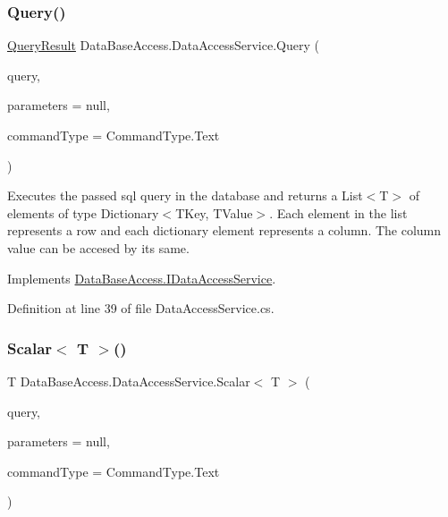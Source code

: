 \mbox{\label{classDataBaseAccess_1_1DataAccessService_a0a2cbe1a4d93a5d946e4ccdb8ac11523}} 
\subsubsection{\texorpdfstring{Query()}{Query()}}
{\footnotesize\ttfamily \mbox{\hyperlink{classDataBaseAccess_1_1QueryResult}{Query\+Result}} Data\+Base\+Access.\+Data\+Access\+Service.\+Query (\begin{DoxyParamCaption}\item[{string}]{query,  }\item[{Dictionary$<$ string, object $>$}]{parameters = {\ttfamily null},  }\item[{Command\+Type}]{command\+Type = {\ttfamily CommandType.Text} }\end{DoxyParamCaption})}



Executes the passed sql query in the database and returns a List$<$\+T$>$ of elements of type Dictionary$<$\+T\+Key, T\+Value$>$. Each element in the list represents a row and each dictionary element represents a column. The column value can be accesed by its same. 



Implements \mbox{\hyperlink{interfaceDataBaseAccess_1_1IDataAccessService_a9beba3c892e23d5c9278d5702a6b64e8}{Data\+Base\+Access.\+I\+Data\+Access\+Service}}.



Definition at line 39 of file Data\+Access\+Service.\+cs.

\mbox{\label{classDataBaseAccess_1_1DataAccessService_a422e6ead446da4cfcdc33255193ac92e}} 
\subsubsection{\texorpdfstring{Scalar$<$ T $>$()}{Scalar< T >()}}
{\footnotesize\ttfamily T Data\+Base\+Access.\+Data\+Access\+Service.\+Scalar$<$ T $>$ (\begin{DoxyParamCaption}\item[{string}]{query,  }\item[{Dictionary$<$ string, object $>$}]{parameters = {\ttfamily null},  }\item[{Command\+Type}]{command\+Type = {\ttfamily CommandType.Text} }\end{DoxyParamCaption})}



